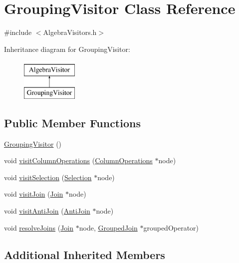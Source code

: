 \hypertarget{class_grouping_visitor}{\section{Grouping\+Visitor Class Reference}
\label{class_grouping_visitor}
}


{\ttfamily \#include $<$Algebra\+Visitors.\+h$>$}

Inheritance diagram for Grouping\+Visitor\+:\begin{figure}[H]
\begin{center}
\leavevmode
\includegraphics[height=2.000000cm]{class_grouping_visitor}
\end{center}
\end{figure}
\subsection*{Public Member Functions}
\begin{DoxyCompactItemize}
\item 
\hyperlink{class_grouping_visitor_adc7a72ec400998ac4dcaacf5c85fb86c}{Grouping\+Visitor} ()
\item 
void \hyperlink{class_grouping_visitor_a2c1557a18e53aaa43665318001df3726}{visit\+Column\+Operations} (\hyperlink{class_column_operations}{Column\+Operations} $\ast$node)
\item 
void \hyperlink{class_grouping_visitor_a4e3563b131b9d26942a6d4693f5c194a}{visit\+Selection} (\hyperlink{class_selection}{Selection} $\ast$node)
\item 
void \hyperlink{class_grouping_visitor_aaa2345624497de18ab3a608e909573aa}{visit\+Join} (\hyperlink{class_join}{Join} $\ast$node)
\item 
void \hyperlink{class_grouping_visitor_a1ddb0cf950feb1df7c2518b543e0d0ad}{visit\+Anti\+Join} (\hyperlink{class_anti_join}{Anti\+Join} $\ast$node)
\item 
void \hyperlink{class_grouping_visitor_a7c6760e32033d79e45159d7907aa8886}{resolve\+Joins} (\hyperlink{class_join}{Join} $\ast$node, \hyperlink{class_grouped_join}{Grouped\+Join} $\ast$grouped\+Operator)
\end{DoxyCompactItemize}
\subsection*{Additional Inherited Members}


